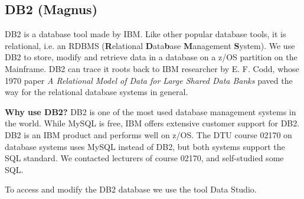 \subsection{DB2 (Magnus)}
DB2 is a database tool made by IBM. Like other popular database tools, it is relational, i.e. an RDBMS (\textbf{R}elational \textbf{D}ata\textbf{b}ase \textbf{M}anagement \textbf{S}ystem). We use DB2 to store, modify and retrieve data in a database on a z/OS partition on the Mainframe. DB2 can trace it roots back to IBM researcher by E. F. Codd, whose 1970 paper \textit{A Relational Model of Data for Large Shared Data Banks}\cite{codd} paved the way for the relational database systems in general.

\textbf{Why use DB2?} DB2 is one of the most used database management systems in the world\cite{db2}. While MySQL is free, IBM offers extensive customer support for DB2. DB2 is an IBM product and performs well on z/OS. The DTU course 02170 on database systems uses MySQL instead of DB2, but both systems support the SQL standard. We contacted lecturers of course 02170, and self-studied some SQL.

To access and modify the DB2 database we use the tool Data Studio.